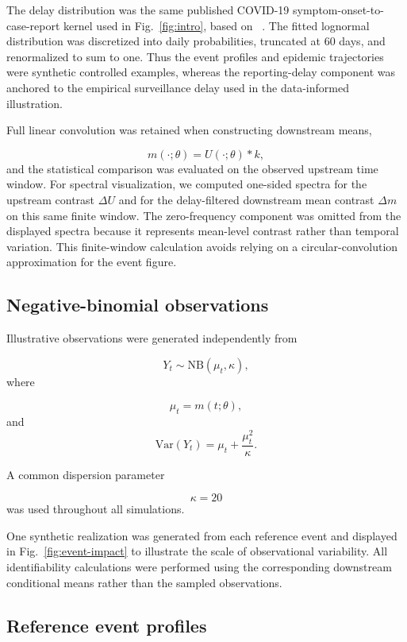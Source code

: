 The delay distribution was the same published COVID-19 symptom-onset-to-case-report kernel used in Fig.~\ref{fig:intro}, based on ~\cite{zhang2020evolving}. The fitted lognormal distribution was discretized into daily probabilities, truncated at 60 days, and renormalized to sum to one. Thus the event profiles and epidemic trajectories were synthetic controlled examples, whereas the reporting-delay component was anchored to the empirical surveillance delay used in the data-informed illustration.

Full linear convolution was retained when constructing downstream means,

\[
m(\cdot;\theta)
=
U(\cdot;\theta)*k,
\]
and the statistical comparison was evaluated on the observed upstream time window. For spectral visualization, we computed one-sided spectra for the upstream contrast \(\Delta U\) and for the delay-filtered downstream mean contrast \(\Delta m\) on this same finite window. The zero-frequency component was omitted from the displayed spectra because it represents mean-level contrast rather than temporal variation. This finite-window calculation avoids relying on a circular-convolution approximation for the event figure.



\subsection{Negative-binomial observations}

Illustrative observations were generated independently from

\[
Y_t
\sim
\mathrm{NB}
(\mu_t,\kappa),
\]
where

\[
\mu_t=m(t;\theta),
\]
and
\[
\mathrm{Var}(Y_t)
=
\mu_t
+
\frac{\mu_t^2}{\kappa}.
\]

A common dispersion parameter

\[
\kappa=20
\]
was used throughout all simulations.

One synthetic realization was generated from each reference event and displayed in Fig.~\ref{fig:event-impact} to illustrate the scale of observational variability. All identifiability calculations were performed using the corresponding downstream conditional means rather than the sampled observations.



\subsection{Reference event profiles}

